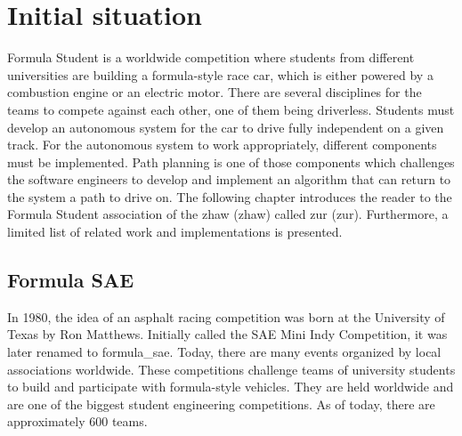 \section{Initial situation} \label{sec:Initial situation}
Formula Student is a worldwide competition where students from different universities are building a formula-style race car, which is either powered by a combustion engine or an electric motor. There are several disciplines for the teams to compete against each other, one of them being \Gls{driverless}. Students must develop an autonomous system for the car to drive fully independent on a given track. For the autonomous system to work appropriately, different components must be implemented. Path planning is one of those components which challenges the software engineers to develop and implement an algorithm that can return to the system a path to drive on. The following chapter introduces the reader to the Formula Student association of the \acrlong{zhaw} (\acrshort{zhaw}) called \acrlong{zur} (\acrshort{zur}). Furthermore, a limited list of related work and implementations is presented.

\subsection{Formula SAE}
In 1980, the idea of an asphalt racing competition was born at the University of Texas by Ron Matthews. Initially called the SAE Mini Indy Competition, it was later renamed to \Gls{formula_sae}. Today, there are many events organized by local associations worldwide. \cite{formula_sae}
These competitions challenge teams of university students to build and participate with formula-style vehicles. They are held worldwide and are one of the biggest student engineering competitions. As of today, there are approximately 600 teams. \cite{sae_student_events}

